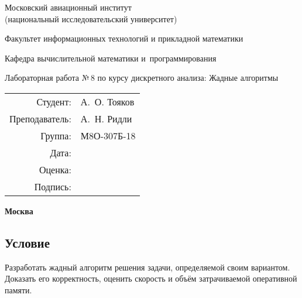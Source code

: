 \documentclass[12pt]{article}
\begin{document}
\thispagestyle{empty}
\begin{center}
	\bfseries

	{\Large Московский авиационный институт\\ (национальный исследовательский университет)

	}

	\vspace{48pt}

	{\large Факультет информационных технологий и прикладной математики
	}

	\vspace{36pt}


	{\large Кафедра вычислительной математики и~программирования

	}


	\vspace{48pt}

	{Лабораторная работа №\,8 по курсу дискретного анализа: Жадные алгоритмы}

\end{center}

\vspace{72pt}

\begin{flushright}
	\begin{tabular}{rl}
		Студент:       & А.\, О. Тояков   \\
		Преподаватель: & А.\, Н. Ридли \\
		Группа:        & М8О-307Б-18      \\
		Дата:          &                 \\
		Оценка:        &                  \\
		Подпись:       &                  \\
	\end{tabular}
\end{flushright}

\vfill

\begin{center}
	\bfseries
	Москва\\
	\the\year
\end{center}

\newpage

\subsection*{Условие}

Разработать жадный алгоритм решения задачи, определяемой своим вариантом. Доказать его корректность, оценить скорость и объём затрачиваемой оперативной памяти.
\end{document}
